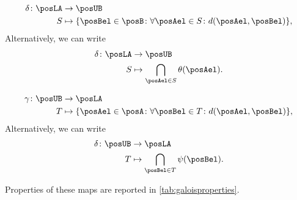 \begin{equation}
  \label{eq:galoisdelta}
  \begin{aligned}
    \delta \colon \posLA&\to \posUB\\
    S&\mapsto \{\posBel\in \posB \colon \forall {\posAel\in S}\colon d(\posAel,\posBel)\},
  \end{aligned}
\end{equation}
Alternatively, we can write
\begin{equation}
  \begin{aligned}
    \delta\colon \posLA &\to \posUB\\
    S&\mapsto \bigcap_{\posAel\in S}\theta(\posAel).
  \end{aligned}
\end{equation}

\begin{equation}
  \label{eq:galoisgamma}
  \begin{aligned}
    \gamma \colon \posUB&\to \posLA\\
    T&\mapsto \{\posAel\in \posA \colon \forall {\posBel\in T}\colon d(\posAel,\posBel)\},
  \end{aligned}
\end{equation}
Alternatively, we can write
\begin{equation}
  \begin{aligned}
    \delta\colon \posUB &\to \posLA\\
    T&\mapsto \bigcap_{\posBel\in T}\psi(\posBel).
  \end{aligned}
\end{equation}

Properties of these maps are reported in \cref{tab:galoisproperties}.

